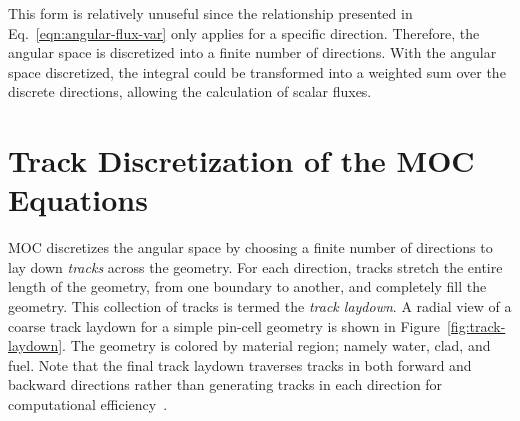 This form is relatively unuseful since the relationship presented in Eq.~\ref{eqn:angular-flux-var} only applies for a specific direction. Therefore, the angular space is discretized into a finite number of directions. With the angular space discretized, the integral could be transformed into a weighted sum over the discrete directions, allowing the calculation of scalar fluxes.

\section{Track Discretization of the MOC Equations}
\label{sec:track-disceretization}

\ac{MOC} discretizes the angular space by choosing a finite number of directions to lay down \textit{tracks} across the geometry. For each direction, tracks stretch the entire length of the geometry, from one boundary to another, and completely fill the geometry. This collection of tracks is termed the \textit{track laydown}. A radial view of a coarse track laydown for a simple pin-cell geometry is shown in Figure~\ref{fig:track-laydown}. The geometry is colored by material region; namely water, clad, and fuel. Note that the final track laydown traverses tracks in both forward and backward directions rather than generating tracks in each direction for computational efficiency~\cite{kochunas2007twoway}.


